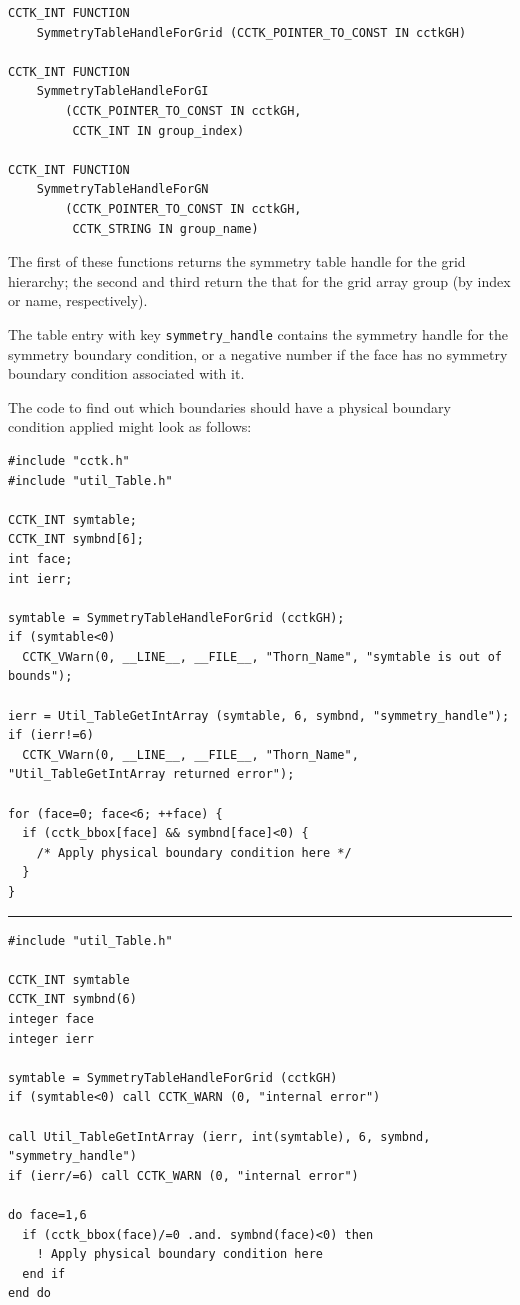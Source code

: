 \begin{verbatim}
CCTK_INT FUNCTION
    SymmetryTableHandleForGrid (CCTK_POINTER_TO_CONST IN cctkGH)

CCTK_INT FUNCTION
    SymmetryTableHandleForGI
        (CCTK_POINTER_TO_CONST IN cctkGH,
         CCTK_INT IN group_index)

CCTK_INT FUNCTION
    SymmetryTableHandleForGN
        (CCTK_POINTER_TO_CONST IN cctkGH,
         CCTK_STRING IN group_name)
\end{verbatim}

The first of these functions returns the symmetry table handle for the
grid hierarchy; the second and third return the that for the grid array group
(by index or name, respectively).

The table entry with key \texttt{symmetry\_handle} contains the symmetry
handle for the symmetry boundary condition, or a negative number if the face
has no symmetry boundary condition associated with it.

The code to find out which boundaries should have a physical boundary
condition applied might look as follows:

\begin{verbatim}
#include "cctk.h"
#include "util_Table.h"

CCTK_INT symtable;
CCTK_INT symbnd[6];
int face;
int ierr;

symtable = SymmetryTableHandleForGrid (cctkGH);
if (symtable<0)
  CCTK_VWarn(0, __LINE__, __FILE__, "Thorn_Name", "symtable is out of bounds");

ierr = Util_TableGetIntArray (symtable, 6, symbnd, "symmetry_handle");
if (ierr!=6)
  CCTK_VWarn(0, __LINE__, __FILE__, "Thorn_Name", "Util_TableGetIntArray returned error");

for (face=0; face<6; ++face) {
  if (cctk_bbox[face] && symbnd[face]<0) {
    /* Apply physical boundary condition here */
  }
}
\end{verbatim}

\hrule

\begin{verbatim}
#include "util_Table.h"

CCTK_INT symtable
CCTK_INT symbnd(6)
integer face
integer ierr

symtable = SymmetryTableHandleForGrid (cctkGH)
if (symtable<0) call CCTK_WARN (0, "internal error")

call Util_TableGetIntArray (ierr, int(symtable), 6, symbnd, "symmetry_handle")
if (ierr/=6) call CCTK_WARN (0, "internal error")

do face=1,6
  if (cctk_bbox(face)/=0 .and. symbnd(face)<0) then
    ! Apply physical boundary condition here
  end if
end do
\end{verbatim}



